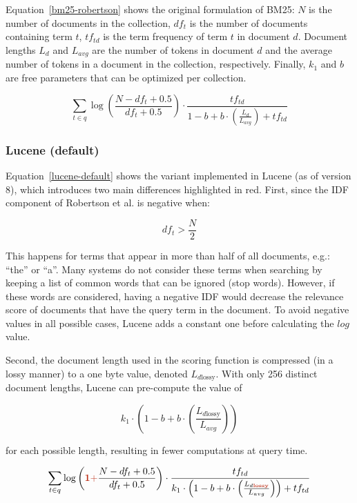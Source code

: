 Equation~\ref{bm25-robertson} shows the original formulation of BM25: $N$ is the number of documents in the collection, $df_t$ is the number of documents containing term $t$, $tf_{td}$ is the term frequency of term $t$ in document $d$. Document lengths $L_d$ and $L_{avg}$ are the number of tokens in document $d$ and the average number of tokens in a document in the collection, respectively. Finally, $k_1$ and $b$ are free parameters that can be optimized per collection. 

\begin{equation}
	\label{bm25-robertson}
	\sum_{t\in q} \log\left(\frac{N-df_t+0.5}{df_t+0.5}\right)\cdot\frac{tf_{td}}{1-b+b\cdot\left(\frac{L_d}{L_{avg}}\right) + tf_{td}}
\end{equation}

\subsubsection{Lucene (default)}
Equation~\ref{lucene-default} shows the variant implemented in Lucene (as of version 8), which introduces two main differences highlighted in red. First, since the IDF component of Robertson et al. is negative when:

\begin{equation}
	df_t > \frac{N}{2} 
\end{equation}

This happens for terms that appear in more than half of all documents, e.g.: ``the'' or ``a''. Many systems do not consider these terms when searching by keeping a list of common words that can be ignored (stop words). However, if these words are considered, having a negative IDF would decrease the relevance score of documents that have the query term in the document. To avoid negative values in all possible cases, Lucene adds a constant one before calculating the $log$ value. 

Second, the document length used in the scoring function is compressed (in a lossy manner) to a one byte value, denoted $L_{d\text{lossy}}$. With only 256 distinct document lengths, Lucene can pre-compute the value of

\begin{equation}
	k_1 \cdot \left(1-b+b\cdot\left(\frac{L_{d\text{lossy}}}{L_{avg}}\right)\right)
\end{equation}

for each possible length, resulting in fewer computations at query time.

\begin{equation}
	\label{lucene-default}
	\sum_{t\in q}\log\left(\mathbf{\begingroup\color{ruhuisstijlrood}1 +\endgroup} \frac{N-df_t+0.5}{df_t+0.5}\right)\cdot\frac{tf_{td}}{k_1\cdot\left(1-b+b\cdot\left(\frac{L_{d \mathbf{\begingroup\color{ruhuisstijlrood}lossy\endgroup}}}{L_{avg}}\right)\right)+tf_{td}}
\end{equation}

